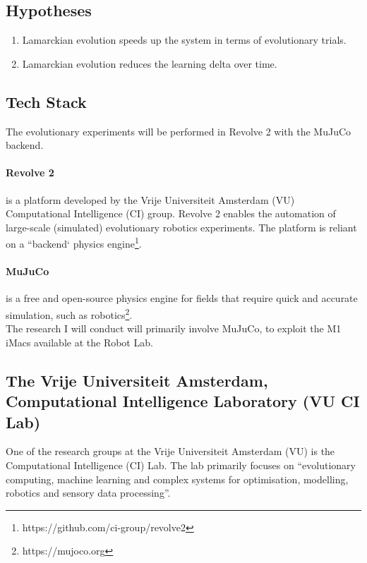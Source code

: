 \documentclass{scrartcl}
\begin{document}
\subsection{Hypotheses}

\begin{enumerate}
    \item Lamarckian evolution speeds up the system in terms of evolutionary trials.
    \item Lamarckian evolution reduces the learning delta over time.
\end{enumerate}

\subsection{Tech Stack}

The evolutionary experiments will be performed in Revolve 2  with the MuJuCo backend.

\paragraph{Revolve 2 } is a platform developed by the Vrije Universiteit Amsterdam (VU) Computational Intelligence (CI) group. Revolve 2 enables the automation of large-scale (simulated) evolutionary robotics experiments. The platform is reliant on a ``backend` physics engine\footnote{https://github.com/ci-group/revolve2}.

\paragraph{MuJuCo} is a free and open-source physics engine for fields that require quick and accurate simulation, such as robotics\footnote{https://mujoco.org}.
\\

The research I will conduct will primarily involve MuJuCo, to exploit the M1 iMacs available at the Robot Lab.

\subsection{The Vrije Universiteit Amsterdam, Computational Intelligence Laboratory (VU CI Lab) }

One of the research groups at the Vrije Universiteit Amsterdam (VU) is the Computational Intelligence (CI) Lab. The lab primarily focuses on ``evolutionary computing, machine learning and complex systems for optimisation, modelling, robotics and sensory data processing''. \\
\end{document}
